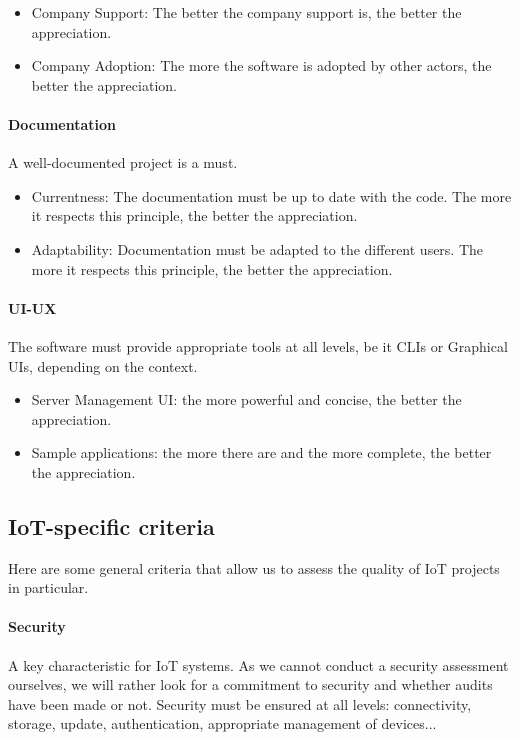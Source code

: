 \documentclass{article}
\begin{document}
\begin{itemize}
\item Company Support: The better the company support is, the better the appreciation.
\item Company Adoption: The more the software is adopted by other actors, the better the appreciation.
\end{itemize}

\paragraph{Documentation} A well-documented project is a must.

\begin{itemize}
\item Currentness: The documentation must be up to date with the code. The more it respects this principle, the better the appreciation.
\item Adaptability: Documentation must be adapted to the different users. The more it respects this principle, the better the appreciation.
\end{itemize}

\paragraph{UI-UX} The software must provide appropriate tools at all levels, be it CLIs or Graphical UIs, depending on the context.

\begin{itemize}
\item Server Management UI: the more powerful and concise, the better the appreciation.
\item Sample applications: the more there are and the more complete, the better the appreciation.
\end{itemize}

\subsection{IoT-specific criteria}

Here are some general criteria that allow us to assess the quality of IoT projects in particular.

\paragraph{Security} A key characteristic for IoT systems. As we cannot conduct a security assessment ourselves, we will rather look for a commitment to security and whether audits have been made or not. Security must be ensured at all levels: connectivity, storage, update, authentication, appropriate management of devices...
\end{document}
